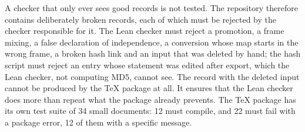 A checker that only ever sees good records is not tested. The repository therefore contains deliberately broken records, each of
which must be rejected by the checker responsible for it. The Lean checker must reject a promotion, a frame mixing, a false declaration
of independence, a conversion whose map starts in the wrong frame, a broken hash link and an input that was deleted by hand; the hash
script must reject an entry whose statement was edited after export, which the Lean checker, not computing MD5, cannot see. The record
with the deleted input cannot be produced by the \TeX{}
package at all. It ensures that the Lean checker does more than repeat what the package already prevents. The \TeX{} package has its
own test suite of 34 small documents: 12 must compile, and 22 must fail with a package error, 12 of them with a specific message.

